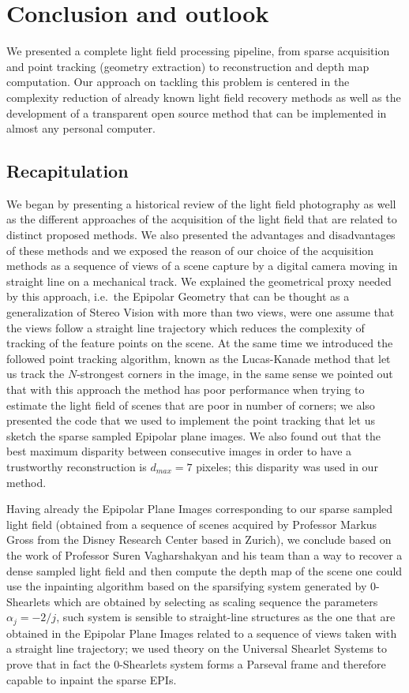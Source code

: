 \chapter{Conclusion and outlook}

We presented a complete light field processing pipeline, from sparse acquisition and point tracking (geometry extraction) to reconstruction and depth map computation. Our approach on tackling this problem is centered in the complexity reduction of already known light field recovery methods as well as the development of a transparent open source method that can be implemented in almost any personal computer.

\section{Recapitulation}

We began by presenting a historical review of the light field photography as well as the different approaches of the acquisition of the light field that are related to distinct proposed methods. We also presented the advantages and disadvantages of these methods and we exposed the reason of our choice of the acquisition methods as a sequence of views of a scene capture by a digital camera moving in straight line on a mechanical track. We explained the geometrical proxy needed by this approach, i.e.\ the Epipolar Geometry that can be thought as a generalization of Stereo Vision with more than two views, were one assume that the views follow a straight line trajectory which reduces the complexity of tracking of the feature points on the scene. At the same time we introduced the followed point tracking algorithm, known as the Lucas-Kanade method that let us track the $N$-strongest corners in the image, in the same sense we pointed out that with this approach the method has poor performance when trying to estimate the light field of scenes that are poor in number of corners; we also presented the code that we used to implement the point tracking that let us sketch the sparse sampled Epipolar plane images. We also found out that the best maximum disparity between consecutive images in order to have a trustworthy reconstruction is $d_{max}=7$ pixeles; this disparity was used in our method.

\bigskip 

Having already the Epipolar Plane Images corresponding to our sparse sampled light field (obtained from a sequence of scenes acquired by Professor Markus Gross from the Disney Research Center based in Zurich), we conclude based on the work of Professor Suren Vagharshakyan and his team \cite{LF-Shearlets} than a way to recover a dense sampled light field and then compute the depth map of the scene one could use the inpainting algorithm based on the sparsifying system generated by $0$-Shearlets which are obtained by selecting as scaling sequence the parameters $\alpha_j=-2/j$, such system is sensible to straight-line structures as the one that are obtained in the Epipolar Plane Images related to a sequence of views taken with a straight line trajectory; we used theory on the Universal Shearlet Systems to prove that in fact the $0$-Shearlets system forms a Parseval frame and therefore capable to inpaint the sparse EPIs. 

